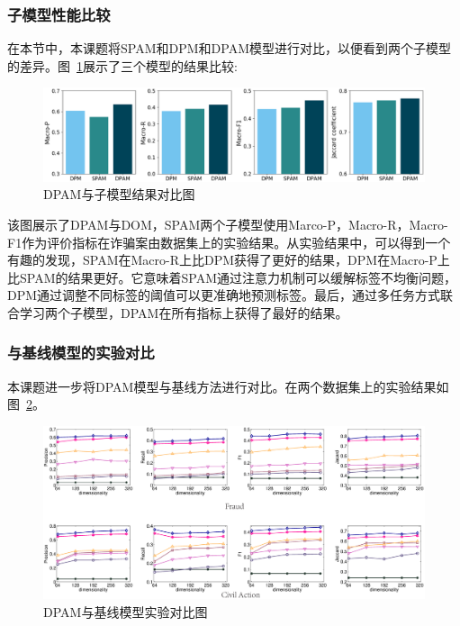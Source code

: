 \subsubsection{子模型性能比较}
在本节中，本课题将SPAM和DPM和DPAM模型进行对比，以便看到两个子模型的差异。图~\ref{fig:comSubm}展示了三个模型的结果比较:
\begin{figure}[htbp]%
\centering
\includegraphics[scale=0.30, clip=true]{./sources/dpam_comSubm2.eps}
\caption{\label{fig:comSubm}DPAM与子模型结果对比图}
\end{figure}

该图展示了DPAM与DOM，SPAM两个子模型使用Marco-P，Macro-R，Macro-F1作为评价指标在诈骗案由数据集上的实验结果。从实验结果中，可以得到一个有趣的发现，SPAM在Macro-R上比DPM获得了更好的结果，DPM在Macro-P上比SPAM的结果更好。它意味着SPAM通过注意力机制可以缓解标签不均衡问题，DPM通过调整不同标签的阈值可以更准确地预测标签。最后，通过多任务方式联合学习两个子模型，DPAM在所有指标上获得了最好的结果。


\subsubsection{与基线模型的实验对比}
本课题进一步将DPAM模型与基线方法进行对比。在两个数据集上的实验结果如图~\ref{fig:comMain}。

\begin{figure}[htbp]
\centering
\includegraphics[scale=0.25, clip=true]{./sources/dpam_comMain.eps}
\caption{\label{fig:comMain}DPAM与基线模型实验对比图}
\end{figure}

